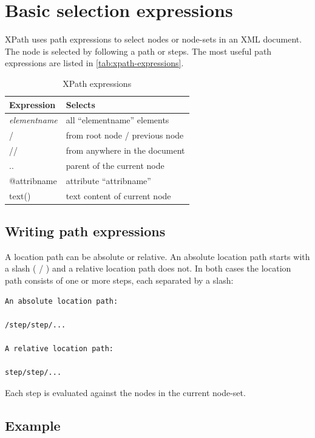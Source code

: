 \documentclass{pgnotes}
\begin{document}
\section{Basic selection expressions}

XPath uses path expressions to select nodes or node-sets in an XML document.
The node is selected by following a path or steps.
The most useful path expressions are listed in \autoref{tab:xpath-expressions}.

\begin{table}[htbp]
  \centering
  \begin{tabular}{l l}
    \toprule
    \textbf{Expression} & \textbf{Selects} \\
    \midrule
    \textit{elementname} &  all ``elementname'' elements\\
    / & from root node / previous node \\
    // & from anywhere in the document \\
    .. & parent of the current node \\
    @attribname & attribute ``attribname'' \\
    text() & text content of current node\\
    \bottomrule
  \end{tabular}
  \caption{XPath expressions}
  \label{tab:xpath-expressions}
\end{table}

\subsection{Writing path expressions}

A location path can be absolute or relative.
An absolute location path starts with a slash ( / ) and a relative location path does not.
In both cases the location path consists of one or more steps, each separated by a slash:

\begin{verbatim}
An absolute location path:

/step/step/...

A relative location path:

step/step/...
\end{verbatim}

Each step is evaluated against the nodes in the current node-set.


\subsection{Example}
\end{document}
